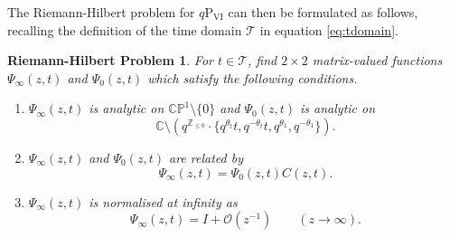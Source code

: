 \documentclass[a4paper,reqno,11pt]{amsart}
\numberwithin{equation}{section}
\numberwithin{figure}{section}
\theoremstyle{plain}
\newtheorem{rhprob}{Riemann-Hilbert Problem}
\theoremstyle{remark}
\newcommand\Psix{\textrm{P}_{\textrm{VI}}}
\newcounter{rhp}
\numberwithin{rhp}{section}
\begin{document}
The Riemann-Hilbert problem for $q\Psix$ can then be formulated as follows, recalling the definition of the time domain $\mathcal{T}$ in equation \eqref{eq:tdomain}.
\begin{rhprob}\label{rhp:standard} 
For $t\in \mathcal{T}$, find $2\times 2$ matrix-valued functions $\Psi_\infty(z,t)$ and $\Psi_0(z,t)$ which satisfy the following conditions.
  \begin{enumerate}[label={{\rm (\roman *)}}]
  \item $\Psi_\infty(z,t)$  is analytic on $\mathbb{CP}^1\setminus \{0\}$ and $\Psi_0(z,t)$ is analytic on \begin{equation}\label{eq:domain_analytic}
      \mathbb{C}\setminus(q^{\mathbb{Z}_{\leq 0}}\cdot \{q^{\theta_t}t,q^{-\theta_t}t,q^{\theta_1},q^{-\theta_1}\}).
  \end{equation}
    \item $\Psi_\infty(z,t)$ and $\Psi_0(z,t)$ are related by
\begin{equation}\label{eq:jump}
   \Psi_\infty(z,t)=\Psi_0(z,t)C(z,t).
\end{equation} 
 \item $\Psi_\infty(z,t)$ is normalised at infinity as
              \begin{equation*}
		\Psi_\infty(z,t)=I+\mathcal{O}(z^{-1})\qquad (z\rightarrow \infty).
              \end{equation*}
    \end{enumerate}
\end{rhprob}
\end{document}
